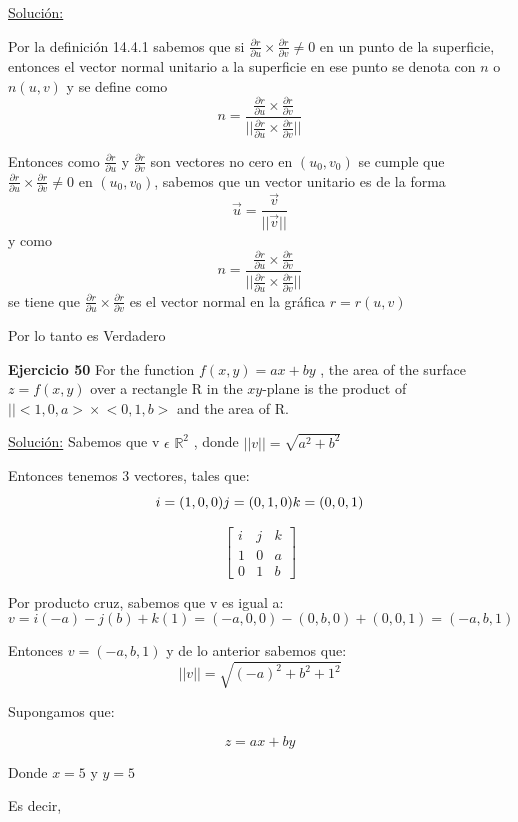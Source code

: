 \documentclass{report}
\newcommand{\s}{\underline{Soluci\'{o}n:}}
\begin{document}
	\s 

	Por la definici\'{o}n 14.4.1 sabemos que si
	$\frac{\partial r}{\partial u}\times \frac{\partial r}{\partial v}\neq 0$ en un punto de la superficie, entonces el vector normal unitario a la superficie en ese punto se denota con $n$ o $n (u, v)$ y se define como
	\[n = \frac{\frac{\partial r}{\partial u}\times \frac{\partial r}{\partial v}}{||\frac{\partial r}{\partial u}\times \frac{\partial r}{\partial v}||} \]
	
	Entonces como $\frac{\partial r}{\partial u}$ y $\frac{\partial r}{\partial v}$ son vectores no cero en $(u_0, v_0)$  se cumple que $\frac{\partial r}{\partial u}\times \frac{\partial r}{\partial v}\neq 0$ en $(u_0, v_0)$, sabemos que un vector unitario es de la forma 
	\[\vec{u} = \frac{\vec{v}}{||\vec{v}||}\] y como \[n = \frac{\frac{\partial r}{\partial u}\times \frac{\partial r}{\partial v}}{||\frac{\partial r}{\partial u}\times \frac{\partial r}{\partial v}||} \] se tiene  que $\frac{\partial r}{\partial u} \times \frac{\partial r}{\partial v}$ es el vector normal en la gr\'{a}fica $r = r(u,v)$
	
	Por lo tanto es Verdadero 
	
	\textbf{Ejercicio 50} For the function $f(x, y) = ax + by$ , the area of the surface
	$z = f(x,y)$ over a rectangle R in the $xy$-plane is the product
	of $\Big||<1, 0, a\Big> \times \Big<0, 1, b \Big>$ and the area of R.
	
	\s 
	Sabemos que v $\epsilon$ $\mathbb{R}^2$ , donde $||v|| = \sqrt{a^2 + b^2} $
	
	Entonces tenemos 3 vectores, tales que:
	\[ i = (1,0,0) \\ j = (0,1,0) \\  k = (0,0,1) \]
	
	
	\[ \begin{bmatrix}
	i & j & k \\
	1 & 0 & a \\
	0 & 1 & b
	\end{bmatrix} \]
	
	Por producto cruz, sabemos que v es igual a:
	\[ v = i(-a) - j(b) + k(1)
	= (-a,0,0) - (0,b,0) + (0,0,1)
	= (-a,b,1) \]
	
	Entonces $v = (-a,b,1)$ y de lo anterior sabemos que:
	\[||v|| = \sqrt{(-a)^2 + b^2 + 1^2} \]
	
	Supongamos que:
	
	\[ z = ax + by \]
	
	Donde $ x = 5 $ y $ y = 5$
	
	Es decir,
	
\end{document}
